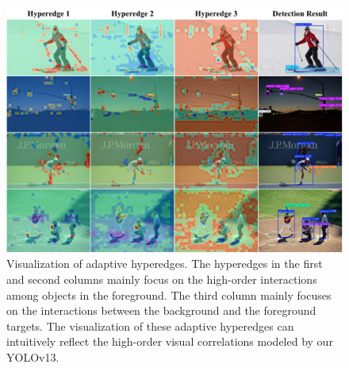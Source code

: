 \begin{figure}
    \centering
    \includegraphics[width=1\linewidth]{figures/vis_edge.pdf}
    \vspace{-0.6cm}
    \caption{Visualization of adaptive hyperedges. The hyperedges in the first and second columns mainly focus on the high-order interactions among objects in the foreground. The third column mainly focuses on the interactions between the background and the foreground targets. The visualization of these adaptive hyperedges can intuitively reflect the high-order visual correlations modeled by our YOLOv13.}
    \vspace{-0.5cm}
    \label{fig:vis_soft}
\end{figure}
